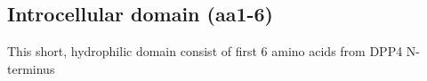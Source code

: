 \subsection{Introcellular domain (aa1-6)}

This short, hydrophilic domain consist of first 6 amino acids from DPP4 N-terminus